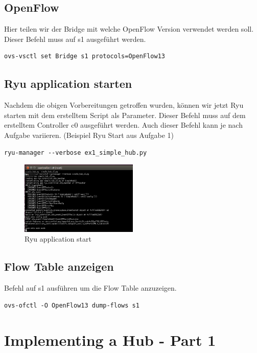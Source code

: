 \documentclass[a4,12pt]{scrartcl}
\begin{document}
\subsection{OpenFlow}
Hier teilen wir der Bridge mit welche OpenFlow Version verwendet werden soll. Dieser Befehl muss auf s1 ausgeführt werden. 
\begin{lstlisting}
ovs-vsctl set Bridge s1 protocols=OpenFlow13
\end{lstlisting}

\subsection{Ryu application starten}
Nachdem die obigen Vorbereitungen getroffen wurden, können wir jetzt Ryu starten mit dem erstelltem Script als Parameter. Dieser Befehl muss auf dem erstelltem Controller c0 ausgeführt werden. Auch dieser Befehl kann je nach Aufgabe variieren. (Beispiel Ryu Start aus Aufgabe 1) 
\begin{lstlisting}
ryu-manager --verbose ex1_simple_hub.py
\end{lstlisting}
\begin{figure} [H]
	\begin{center}
	\includegraphics[width=0.50\textwidth]{./pictures/ryu_start_simple_hub.png}
	\caption{Ryu application start}
	\label{x}
	\end{center}
\end{figure} 

\subsection{Flow Table anzeigen}
Befehl auf s1 ausführen um die Flow Table anzuzeigen. 
\begin{lstlisting}
ovs-ofctl -O OpenFlow13 dump-flows s1
\end{lstlisting}
\newpage

\section{Implementing a Hub - Part 1}
\end{document}
